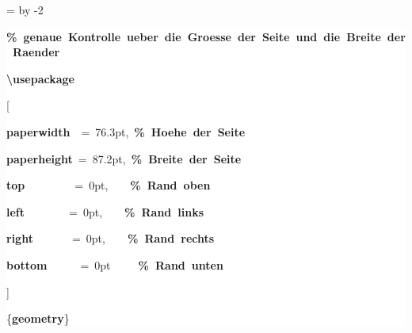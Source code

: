 \begingroup
\ttfamily
{}
=\textwidth
\advance{} by -2\fboxsep
\noindent
\colorbox{background}
{%
\parbox{\dimen255}
{%
\rule[-0.5ex]{0pt}{2.5ex}\hspace*{0.0em}\textcolor{G}{\textbf{\%~genaue~Kontrolle~ueber~die~Groesse~der~Seite~und~die~Breite~der~Raender}}\\
\rule[-0.5ex]{0pt}{2.5ex}\hspace*{0.0em}\textcolor{R}{\textbf{\textbackslash{}usepackage}}\\
\rule[-0.5ex]{0pt}{2.5ex}\hspace*{0.0em}[\\
\rule[-0.5ex]{0pt}{2.5ex}\hspace*{1.0em}\textcolor{R}{\textbf{paperwidth}}~~=~76.3pt,~\textcolor{G}{\textbf{\%~Hoehe~der~Seite}}\\
\rule[-0.5ex]{0pt}{2.5ex}\hspace*{1.0em}\textcolor{R}{\textbf{paperheight}}~=~87.2pt,~\textcolor{G}{\textbf{\%~Breite~der~Seite}}\\
\rule[-0.5ex]{0pt}{2.5ex}\hspace*{1.0em}\textcolor{R}{\textbf{top}}~~~~~~~~~=~0pt,~~~~\textcolor{G}{\textbf{\%~Rand~oben}}\\
\rule[-0.5ex]{0pt}{2.5ex}\hspace*{1.0em}\textcolor{R}{\textbf{left}}~~~~~~~~=~0pt,~~~~\textcolor{G}{\textbf{\%~Rand~links}}\\
\rule[-0.5ex]{0pt}{2.5ex}\hspace*{1.0em}\textcolor{R}{\textbf{right}}~~~~~~~=~0pt,~~~~\textcolor{G}{\textbf{\%~Rand~rechts}}\\
\rule[-0.5ex]{0pt}{2.5ex}\hspace*{1.0em}\textcolor{R}{\textbf{bottom}}~~~~~~=~0pt~~~~~\textcolor{G}{\textbf{\%~Rand~unten}}\\
\rule[-0.5ex]{0pt}{2.5ex}\hspace*{0.0em}]\\
\rule[-0.5ex]{0pt}{2.5ex}\hspace*{0.0em}\{\textcolor{R}{\textbf{geometry}}\}}%
}%
\endgroup
